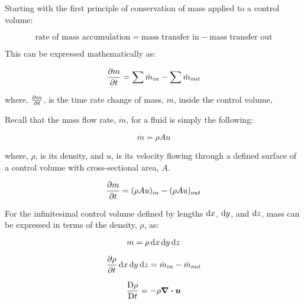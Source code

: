 \documentclass[11pt, oneside]{article}   	%
\newcommand{\vect}[1]{\boldsymbol{#1}} %
\begin{document}
\begin{figure}
\begin{tikzpicture}[scale = 3]
    \end{tikzpicture}
    
\end{figure}

Starting with the first principle of conservation of mass applied to a control volume:

\begin{equation}
\text{rate of mass accumulation} = \text{mass transfer in} - \text{mass transfer out}
\end{equation}

\noindent 
This can be expressed mathematically as:

\begin{equation}
\pdv{m}{t} = \sum \dot{m}_{in} - \sum \dot{m}_{out}
\end{equation}

\noindent
where, {$ \pdv{m}{t} $}, is the time rate change of mass, {$ m $}, inside the control volume, 

\noindent
Recall that the mass flow rate, {$  \dot{m} $}, for a fluid is simply the following:

\begin{equation}
\dot{m}  = \rho A u
\end{equation}

\noindent
where, {$ \rho $}, is its density, and {$ u $}, is its velocity flowing through a defined surface of a control volume with cross-sectional area,  {$ A $}.

\begin{equation}
\pdv{m}{t} = (\rho A u)_{in} - (\rho A u)_{out}
\end{equation}

\noindent
For the infinitesimal control volume defined by lengths $\dif x$, $\dif y$, and $\dif z$, mass can be expressed in terms of the density, $\rho$, as:

\begin{equation}
m = \rho \dif x \dif y \dif z
\end{equation}

\begin{equation}
\pdv{\rho}{t} \dif x \dif y \dif z = \dot{m}_{in} - \dot{m}_{out}
\end{equation}

\begin{equation}
\frac{\Dif \rho}{\Dif t}   = - \rho \div \vect{u}
\end{equation}
\end{document}
